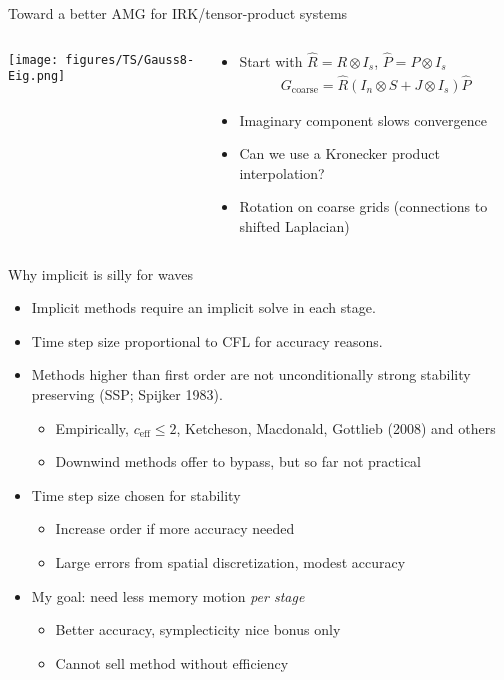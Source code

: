 \documentclass{beamer}
\begin{document}
\begin{frame}{Toward a better AMG for IRK/tensor-product systems}
  \begin{columns}
    \begin{column}{0.3\textwidth}
      \texttt{[image: figures/TS/Gauss8-Eig.png]}
    \end{column}
    \begin{column}{0.7\textwidth}
      \begin{itemize}
      \item Start with $\hat R = R \otimes I_s$, $\hat P = P \otimes I_s$
        \begin{gather*}
          G_{\text{coarse}} = \hat R (I_n \otimes S + J \otimes I_s) \hat P
        \end{gather*}
      \item Imaginary component slows convergence
      \item Can we use a Kronecker product interpolation?
      \item Rotation on coarse grids (connections to shifted Laplacian)
      \end{itemize}
    \end{column}
  \end{columns}
\end{frame}

\begin{frame}{Why implicit is silly for waves}
  \begin{itemize}
  \item Implicit methods require an implicit solve in each stage.
  \item Time step size proportional to CFL for accuracy reasons.
  \item Methods higher than first order are not unconditionally strong stability preserving (SSP; Spijker 1983).
    \begin{itemize}
    \item Empirically, $c_{\text{eff}} \le 2$, Ketcheson, Macdonald, Gottlieb (2008) and others
    \item Downwind methods offer to bypass, but so far not practical
    \end{itemize}
  \item Time step size chosen for stability
    \begin{itemize}
    \item Increase order if more accuracy needed
    \item Large errors from spatial discretization, modest accuracy
    \end{itemize}
  \item My goal: need less memory motion \emph{per stage}
    \begin{itemize}
    \item Better accuracy, symplecticity nice bonus only
    \item Cannot sell method without efficiency
    \end{itemize}
  \end{itemize}
\end{frame}
\end{document}
